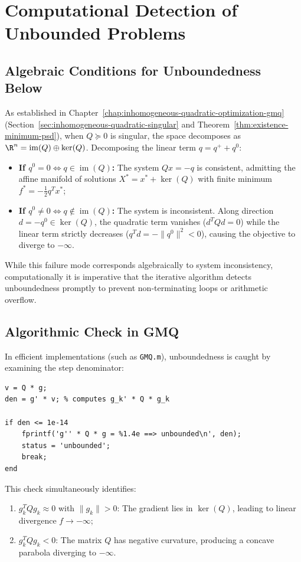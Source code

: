 \FloatBarrier
\section{Computational Detection of Unbounded Problems}
\label{sec:detection-unbounded-problems}

\subsection{Algebraic Conditions for Unboundedness Below}
As established in Chapter~\ref{chap:inhomogeneous-quadratic-optimization-gmq} (Section~\ref{sec:inhomogeneous-quadratic-singular} and Theorem~\ref{thm:existence-minimum-psd}), when $Q \succeq 0$ is singular, the space decomposes as $\R^n = \operatorname{im}(Q) \oplus \ker(Q)$. Decomposing the linear term $q = q^+ + q^0$:
\begin{itemize}
    \item \textbf{If $q^0 = 0 \iff q \in \operatorname{im}(Q)$:} The system $Q x = -q$ is consistent, admitting the affine manifold of solutions $X^* = x^* + \ker(Q)$ with finite minimum $f^* = -\frac{1}{2} q^T x^*$;
    \item \textbf{If $q^0 \neq 0 \iff q \notin \operatorname{im}(Q)$:} The system is inconsistent. Along direction $d = -q^0 \in \ker(Q)$, the quadratic term vanishes ($d^T Q d = 0$) while the linear term strictly decreases ($q^T d = -\|q^0\|^2 < 0$), causing the objective to diverge to $-\infty$.
\end{itemize}
While this failure mode corresponds algebraically to system inconsistency, computationally it is imperative that the iterative algorithm detects unboundedness promptly to prevent non-terminating loops or arithmetic overflow.

\subsection{Algorithmic Check in GMQ}
In efficient implementations (such as \texttt{GMQ.m}), unboundedness is caught by examining the step denominator:
\begin{lstlisting}[style=code,caption={Numerical unboundedness detection in GMQ.}]
v = Q * g;
den = g' * v; % computes g_k' * Q * g_k

if den <= 1e-14
    fprintf('g'' * Q * g = %1.4e ==> unbounded\n', den);
    status = 'unbounded';
    break;
end
\end{lstlisting}
This check simultaneously identifies:
\begin{enumerate}
    \item $g_k^T Q g_k \approx 0$ with $\|g_k\| > 0$: The gradient lies in $\ker(Q)$, leading to linear divergence $f \to -\infty$;
    \item $g_k^T Q g_k < 0$: The matrix $Q$ has negative curvature, producing a concave parabola diverging to $-\infty$.
\end{enumerate}

